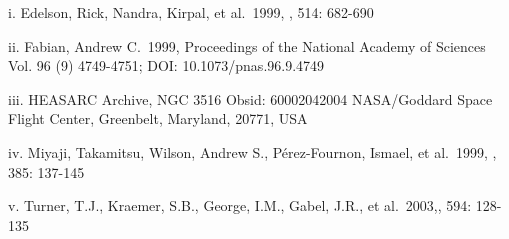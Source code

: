 \documentclass[letterpaper,11pt,twocolumn]{article}
\begin{document}
\pagebreak
\begin{thebibliography}{99}

 i. Edelson, Rick, Nandra, Kirpal, et al.\ 1999, \apj, 514: 682-690

 ii. Fabian, Andrew C.\ 1999, Proceedings of the National Academy of Sciences Vol. 96 (9) 4749-4751; DOI: 10.1073/pnas.96.9.4749

 iii. HEASARC Archive, NGC 3516 Obsid: 60002042004 NASA/Goddard Space Flight Center, Greenbelt, Maryland, 20771, USA

 iv. Miyaji, Takamitsu, Wilson, Andrew S., Pérez-Fournon, Ismael, et al.\ 1999, \apj, 385: 137-145

 v. Turner, T.J., Kraemer, S.B., 
George, I.M., Gabel, J.R., et al.\ 2003,\apj, 594: 128-135




\end{thebibliography}


\end{document}
